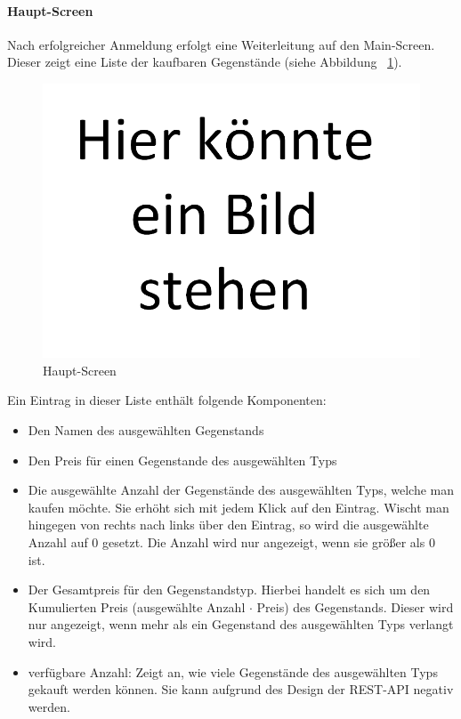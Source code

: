 \documentclass{scrartcl}
\begin{document}
		\paragraph*{Haupt-Screen}
		Nach erfolgreicher Anmeldung erfolgt eine Weiterleitung auf den Main-Screen. Dieser zeigt eine Liste der kaufbaren Gegenstände (siehe Abbildung ~\ref{mainscreen}).

		\begin{figure}[!h]
			\centering
			\includegraphics[scale=0.5]{./figures/placeholder.png}
			\caption{Haupt-Screen}
			\label{mainscreen}
		\end{figure}
		
		Ein Eintrag in dieser Liste enthält folgende Komponenten:
		
		\begin{itemize}
			\item Den Namen des ausgewählten Gegenstands
			
			\item Den Preis für einen Gegenstande des ausgewählten Typs
			
			\item Die ausgewählte Anzahl der Gegenstände des ausgewählten Typs, welche man kaufen möchte. Sie erhöht sich mit jedem Klick auf den Eintrag. Wischt man hingegen von rechts nach links über den Eintrag, so wird die ausgewählte Anzahl auf 0 gesetzt. Die Anzahl wird nur angezeigt, wenn sie größer als 0 ist.
			
			\item Der Gesamtpreis für den Gegenstandstyp. Hierbei handelt es sich um den Kumulierten Preis (ausgewählte Anzahl $\cdot$ Preis) des Gegenstands. Dieser wird nur angezeigt, wenn mehr als ein Gegenstand des ausgewählten Typs verlangt wird.
			
			\item verfügbare Anzahl: Zeigt an, wie viele Gegenstände des ausgewählten Typs gekauft werden können. Sie kann aufgrund des Design der REST-API negativ werden.
		\end{itemize}
	
\end{document}
